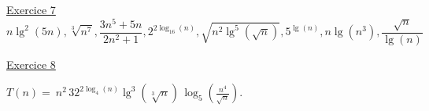 \documentclass[11pt]{article}
\begin{document}
\bigskip


\underline{Exercice 7} 
$$   n \lg^2(5n), \sqrt[3]{n^7}, \frac{3n^5+5n}{2n^2+1},2^{2 \log_{16}(n)} , \sqrt{n^2 \lg^5\left(\sqrt{n}\right)}, 5^{\lg(n)},n \lg(n^3),\frac{\sqrt{n}}{\lg(n)}$$

\bigskip


\underline{Exercice 8} 

$T(n)=\ n^2\, 32^{ 2\log_4(n)} \lg^3\left(\sqrt[3]{n}\right) \, \log_5\left(\frac{n^4}{\sqrt{n}} \right) $. 
\end{document}
